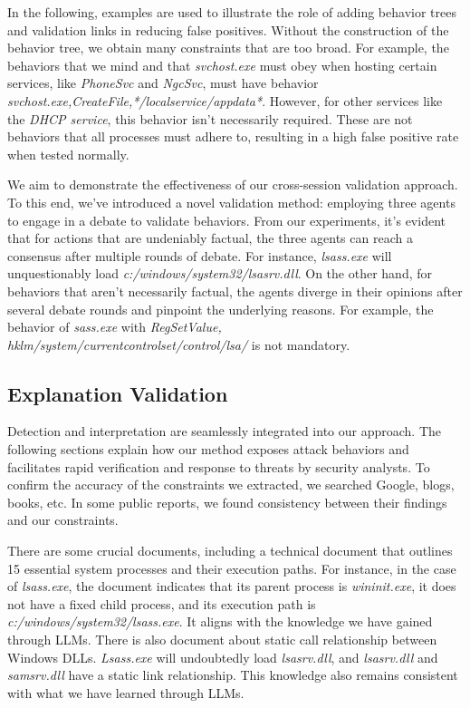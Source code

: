 In the following, examples are used to illustrate the role of adding behavior trees and validation links in reducing false positives.
Without the construction of the behavior tree, we obtain many constraints that are too broad.
For example, the behaviors that we mind and that \textit{svchost.exe} must obey when hosting certain services, like \textit{PhoneSvc} and \textit{NgcSvc}, must have behavior \textit{svchost.exe,CreateFile,*/localservice/appdata*}. However, for other services like the \textit{DHCP service}, this behavior isn't necessarily required.
These are not behaviors that all processes must adhere to, resulting in a high false positive rate when tested normally. 

We aim to demonstrate the effectiveness of our cross-session validation approach. To this end, we've introduced a novel validation method: employing three agents to engage in a debate to validate behaviors. From our experiments, it's evident that for actions that are undeniably factual, the three agents can reach a consensus after multiple rounds of debate. For instance, \textit{lsass.exe} will unquestionably load \textit{c:/windows/system32/lsasrv.dll}. On the other hand, for behaviors that aren't necessarily factual, the agents diverge in their opinions after several debate rounds and pinpoint the underlying reasons. For example, the behavior of \textit{sass.exe} with \textit{RegSetValue, hklm/system/currentcontrolset/control/lsa/} is not mandatory.



\subsection{Explanation Validation}
\label{sec-explanation-val}

Detection and interpretation are seamlessly integrated into our approach. The following sections explain how our method exposes attack behaviors and facilitates rapid verification and response to threats by security analysts.
To confirm the accuracy of the constraints we extracted, we searched Google, blogs, books, etc. In some public reports, we found consistency between their findings and our constraints.

There are some crucial documents\cite{nasbench}, including a technical document that outlines 15 essential system processes and their execution paths. For instance, in the case of \textit{lsass.exe}, the document indicates that its parent process is \textit{wininit.exe}, it does not have a fixed child process, and its execution path is \textit{c:/windows/system32/lsass.exe}. It aligns with the knowledge we have gained through LLMs.
There is also document\cite{windows10dll} about static call relationship between Windows DLLs. \textit{Lsass.exe} will undoubtedly load \textit{lsasrv.dll}, and \textit{lsasrv.dll} and \textit{samsrv.dll} have a static link relationship. This knowledge also remains consistent with what we have learned through LLMs.

